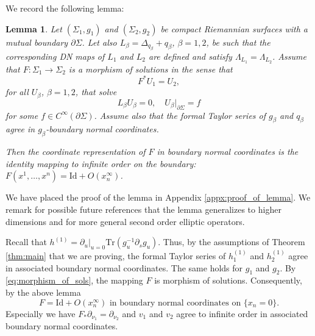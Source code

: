 \documentclass[12pt]{amsart}
\def\p{\partial}
\newtheorem{lemma}[theorem]{Lemma}
\theoremstyle{definition}
\theoremstyle{remark}
\newcommand{\tbl}[1]{\textcolor{blue}{#1}}
\newcommand{\f}[1]{\footnote{\tbl{#1}}}
\begin{document}
We record the following lemma:
\begin{lemma}\label{lem:F_id_infty}
 Let $(\Sigma_1,g_1)$ and $(\Sigma_2,g_2)$ be compact Riemannian surfaces with a mutual boundary $\p \Sigma$. Let also $L_\beta=\Delta_{q_\beta}+q_\beta$, $\beta=1,2$, be such that the corresponding DN maps of $L_1$ and $L_2$ are defined and satisfy $\Lambda_{L_1}=\Lambda_{L_2}$. Assume that $F:\Sigma_1\to \Sigma_2$ is a morphism of solutions in the sense that
\[
 F^*U_1=U_2, 
\]
for all $U_\beta$, $\beta=1,2$, that solve
\[
 L_\beta U_\beta=0, \quad U_\beta|_{\p \Sigma} =f
\]
for some $f\in C^\infty(\p \Sigma)$. Assume also that the formal Taylor series of $g_\beta$ and $q_\beta$ agree in $g_\beta$-boundary normal coordinates. 

Then the coordinate representation of $F$ in boundary normal coordinates is the identity mapping to infinite order on the boundary: $F(x^1,\ldots, x^n)=\text{Id} + O(x_n^\infty)$.
\end{lemma}
We have placed the proof of the lemma in Appendix \ref{appx:proof_of_lemma}. We remark for possible future references that the lemma generalizes to higher dimensions and for more general second order elliptic operators.

Recall that $h^{(1)}=\p_u|_{u=0} \text{Tr}(g_u^{-1}\p_sg_u)$. Thus, by the assumptions of Theorem \ref{thm:main} that we are proving, the formal Taylor series of $h_1^{(1)}$ and $h_2^{(1)}$ agree in associated boundary normal coordinates. The same holds for $g_1$ and $g_2$. By \eqref{eq:morphism_of_sols}, the mapping $F$ is morphism of solutions. Consequently, by the above lemma 
\begin{equation}\label{eq:F_id_to_infinite}
F=\text{Id} + O(x_n^\infty) \text{ in boundary normal coordinates on } \{x_n=0\}.
\end{equation}
Especially we have $F_*\p_{\nu_1}=\p_{\nu_2}$ and $v_1$ and $v_2$ agree to infinite order in associated boundary normal coordinates.

\end{document}
